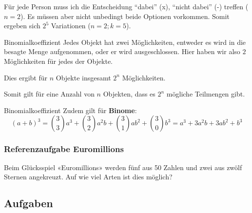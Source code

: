 Für jede Person muss ich die Entscheidung ``dabei'' (x), ``nicht dabei'' (-) treffen ($n=2$). Es müssen aber nicht unbedingt beide Optionen vorkommen. Somit ergeben sich $2^5$ Variationen ($n=2; k=5$).


\begin{bemerkung}{Binomialkoeffizient}{}
  Jedes Objekt hat zwei Möglichkeiten, entweder es wird in die besagte
  Menge aufgenommen, oder er wird ausgeschlossen. Hier haben wir also
  $2$ Möglichkeiten für jedes der Objekte.
  
  Dies ergibt für $n$ Objekte insgesamt $2^n$ Möglichkeiten.

  Somit gilt für eine Anzahl von $n$ Objekten, dass es $2^n$ mögliche
  Teilmengen gibt.
\end{bemerkung}
\newpage


\begin{bemerkung}{Binomialkoeffizient}{}
  Zudem gilt für \textbf{Binome}:
  $$(a+b)^3 = {3\choose 3} a^3+ {3\choose 2} a^2b + {3\choose1} ab^2 + {3\choose 0}b^3 = a^3 + 3a^2b + 3ab^2 + b^3$$
  $$$$
  \end{bemerkung}

\subsubsection{Referenzaufgabe Euromillions}
Beim Glücksspiel «Euromillions» werden fünf aus 50 Zahlen und zwei aus zwölf Sternen angekreuzt. Auf wie viel Arten ist dies möglich?



\subsection*{Aufgaben}





\newpage


\newpage



